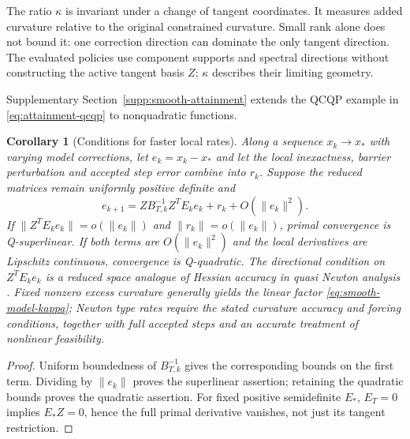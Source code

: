 \documentclass[pdflatex,sn-mathphys-num]{sn-jnl}
\theoremstyle{thmstyleone}
\newtheorem{corollary}[theorem]{Corollary}
\theoremstyle{thmstylethree}
\begin{document}
The ratio $\kappa$ is invariant under a change of tangent coordinates.
It measures added curvature relative to the original constrained
curvature. Small rank alone does not bound it: one correction direction
can dominate the only tangent direction. The evaluated policies use
component supports and spectral directions without constructing the
active tangent basis $Z$; $\kappa$ describes their limiting geometry.



Supplementary Section~\ref{supp:smooth-attainment} extends the QCQP example
in \eqref{eq:attainment-qcqp} to nonquadratic functions.

\begin{corollary}[Conditions for faster local rates]
Along a sequence $x_k\to x_*$ with varying model corrections,
let $e_k=x_k-x_*$ and let the local
inexactness, barrier perturbation and accepted step error combine into $r_k$.
Suppose the reduced matrices remain uniformly positive definite and
\[
 e_{k+1}=ZB_{T,k}^{-1}Z^TE_ke_k+r_k+O(\|e_k\|^2).
\]
If $\|Z^TE_ke_k\|=o(\|e_k\|)$ and $\|r_k\|=o(\|e_k\|)$, primal
convergence is Q-superlinear. If both terms are $O(\|e_k\|^2)$ and the
local derivatives are Lipschitz continuous, convergence is Q-quadratic.
The directional condition on $Z^TE_ke_k$ is a reduced space analogue
of Hessian accuracy in quasi Newton analysis \citep{DennisMore1974}.
Fixed nonzero excess curvature generally yields the linear factor
\eqref{eq:smooth-model-kappa}; Newton type rates require the stated
curvature accuracy and forcing conditions, together with full accepted
steps and an accurate treatment of nonlinear feasibility.
\end{corollary}
\begin{proof}
Uniform boundedness of $B_{T,k}^{-1}$ gives the corresponding bounds on
the first term. Dividing by $\|e_k\|$ proves the superlinear assertion;
retaining the quadratic bounds proves the quadratic assertion. For fixed
positive semidefinite $E_*$, $E_T=0$ implies $E_*Z=0$, hence the full
primal derivative vanishes, not just its tangent restriction.
\end{proof}
\end{document}
